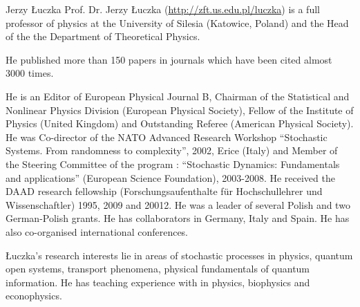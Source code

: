 \begin{participant}[type=PI,PM=5,gender=male]{Jerzy Łuczka}
Prof. Dr. Jerzy Łuczka (\url{http://zft.us.edu.pl/luczka}) is
a full professor of physics at the University of Silesia (Katowice,
Poland) and the Head of the the Department of Theoretical Physics.

He published more than 150 papers in journals  which have been cited almost 3000 times.

He is an Editor of European Physical Journal B, Chairman of the
Statistical and Nonlinear Physics Division (European Physical
Society), Fellow of the Institute of Physics (United Kingdom) and
Outstanding Referee (American Physical Society). He was Co-director of
the NATO Advanced Research Workshop ``Stochastic Systems. From
randomness to complexity'', 2002, Erice (Italy) and Member of the
Steering Committee of the program : ``Stochastic Dynamics: Fundamentals
and applications'' (European Science Foundation), 2003-2008.  He
received the DAAD research fellowship (Forschungsaufenthalte für
Hochschullehrer und Wissenschaftler) 1995, 2009 and 20012. He was a
leader of several Polish and two German-Polish grants. He has
collaborators in Germany, Italy and Spain. He has also co-organised
international conferences.

Łuczka’s research interests lie in areas of stochastic processes in
physics, quantum open systems, transport phenomena, physical
fundamentals of quantum information. He has teaching experience with
\Sage in physics, biophysics and econophysics.


\end{participant}